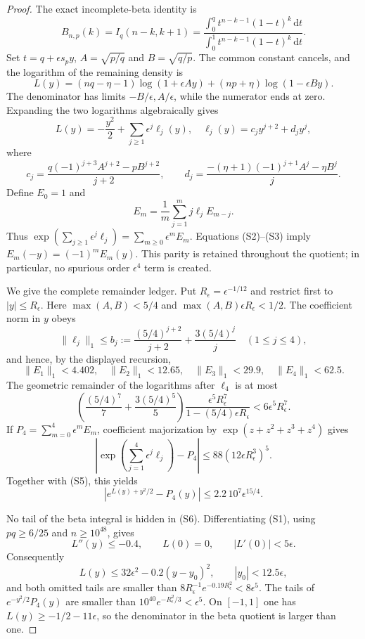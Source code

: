 \documentclass[11pt,a4paper]{article}
\numberwithin{equation}{section}
\theoremstyle{definition}
\theoremstyle{remark}
\newcommand{\dd}{\,\mathrm d}
\begin{document}
\begin{proof}
The exact incomplete-beta identity is
\[
 B_{n,p}(k)=I_q(n-k,k+1)
 =\frac{\int_0^q t^{n-k-1}(1-t)^k\dd t}
        {\int_0^1 t^{n-k-1}(1-t)^k\dd t}.
\]
Set $t=q+\epsilon s_p y$, $A=\sqrt{p/q}$ and $B=\sqrt{q/p}$.
The common constant cancels, and the logarithm of the remaining density is
\[
 L(y)=(nq-\eta-1)\log(1+\epsilon Ay)
      +(np+\eta)\log(1-\epsilon By).                 \tag{S1}
\]
The denominator has limits $-B/\epsilon,A/\epsilon$, while the numerator
ends at zero.  Expanding the two logarithms algebraically gives
\[
 L(y)=-\frac{y^2}{2}+\sum_{j\ge1}\epsilon^j\ell_j(y),
 \quad
 \ell_j(y)=c_jy^{j+2}+d_jy^j,                         \tag{S2}
\]
where
\[
 c_j=\frac{q(-1)^{j+3}A^{j+2}-pB^{j+2}}{j+2},\qquad
 d_j=\frac{-(\eta+1)(-1)^{j+1}A^j-\eta B^j}{j}.       \tag{S3}
\]
Define $E_0=1$ and
\[
 E_m=\frac1m\sum_{j=1}^m j\ell_jE_{m-j}.
\]
Thus $\exp(\sum_{j\ge1}\epsilon^j\ell_j)
=\sum_{m\ge0}\epsilon^mE_m$.  Equations (S2)--(S3) imply
$E_m(-y)=(-1)^mE_m(y)$.  This parity is retained throughout the quotient;
in particular, no spurious order $\epsilon^4$ term is created.

We give the complete remainder ledger.  Put
$R_\epsilon=\epsilon^{-1/12}$ and restrict first to
$|y|\le R_\epsilon$.  Here $\max(A,B)<5/4$ and
$\max(A,B)\epsilon R_\epsilon<1/2$.  The coefficient norm in $y$ obeys
\[
 \|\ell_j\|_1\le
 b_j:=\frac{(5/4)^{j+2}}{j+2}+\frac{3(5/4)^j}{j}
 \quad(1\le j\le4),
\]
and hence, by the displayed recursion,
\[
 \|E_1\|_1<4.402,\quad \|E_2\|_1<12.65,\quad
 \|E_3\|_1<29.9,\quad \|E_4\|_1<62.5.             \tag{S4}
\]
The geometric remainder of the logarithms after $\ell_4$ is at most
\[
 \left(\frac{(5/4)^7}{7}+\frac{3(5/4)^5}{5}\right)
 \frac{\epsilon^5R_\epsilon^7}{1-(5/4)\epsilon R_\epsilon}
 <6\epsilon^5R_\epsilon^7.                           \tag{S5}
\]
If $P_4=\sum_{m=0}^4\epsilon^mE_m$, coefficient majorization by
$\exp(z+z^2+z^3+z^4)$ gives
\[
 \left|\exp\left(\sum_{j=1}^4\epsilon^j\ell_j\right)-P_4\right|
 \le88(12\epsilon R_\epsilon^3)^5.
\]
Together with (S5), this yields
\[
 |e^{L(y)+y^2/2}-P_4(y)|
 \le2.2\,10^7\epsilon^{15/4}.                       \tag{S6}
\]

No tail of the beta integral is hidden in (S6).  Differentiating (S1),
using $pq\ge6/25$ and $n\ge10^{48}$, gives
\[
 L''(y)\le-0.4,\qquad L(0)=0,\qquad |L'(0)|<5\epsilon.
\]
Consequently
\[
 L(y)\le32\epsilon^2-0.2(y-y_0)^2,\qquad |y_0|<12.5\epsilon,
\]
and both omitted tails are smaller than
$8R_\epsilon^{-1}e^{-0.19R_\epsilon^2}<8\epsilon^5$.
The tails of $e^{-y^2/2}P_4(y)$ are smaller than
$10^{40}e^{-R_\epsilon^2/3}<\epsilon^5$.  On $[-1,1]$ one has
$L(y)\ge-1/2-11\epsilon$, so the denominator in the beta quotient is
larger than one.


\end{proof}
\end{document}
